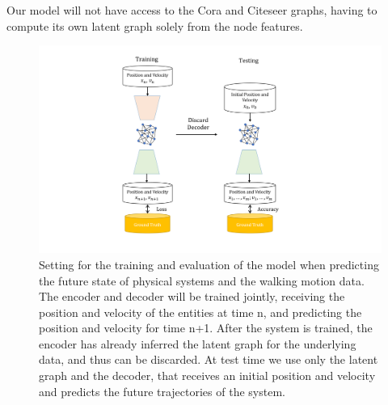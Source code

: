 \documentclass[12pt,a4paper]{article}
\begin{document}
	Our model will not have access to the Cora and Citeseer graphs, having to compute its own latent graph solely from the node features.
	
	\begin{figure}[hbtp]
		\includegraphics[width=\textwidth]{eval_part1_2.png}
		\caption{Setting for the training and evaluation of the model when predicting the future state of physical systems and the walking motion data. The encoder and decoder will be trained jointly, receiving the position and velocity of the entities at time n, and predicting the position and velocity for time n+1. After the system is trained, the encoder has already inferred the latent graph for the underlying data, and thus can be discarded. At test time we use only the latent graph and the decoder, that receives an initial position and velocity and predicts the future trajectories of the system. \label{eval1}}
	\end{figure}
\end{document}
